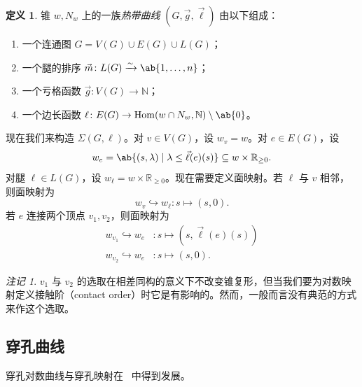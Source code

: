 \documentclass{amsart}
\theoremstyle{definition}
\newtheorem{defn}[thm]{定义}
\theoremstyle{remark}
\newtheorem{rmk}[thm]{注记}
\theoremstyle{plain}
\theoremstyle{definition}
\theoremstyle{remark}
\newcommand{\N}{\mathbb{N}}
\newcommand{\R}{\mathbb{R}}
\newcommand{\1}{\mathbf{1}}
\newcommand{\2}{\mathbf{2}}
\newcommand{\3}{\mathbf{3}}
\DeclareMathOperator{\Hom}{Hom}
\begin{document}
\begin{defn}
    锥 \(w, N_w\) 上的一族\textit{热带曲线} \((G, \vec{g}, \vec{\ell})\) 由以下组成：
    \begin{enumerate}
        \item 一个连通图 \(G = V(G) \cup E(G) \cup L(G)\)；
        \item 一个腿的排序 \(\vec{m} \colon L(G) \xrightarrow{\sim} \ab\{1, \ldots, n\}\)；
        \item 一个亏格函数 \(\vec{g} \colon V(G) \to \N\)；
        \item 一个边长函数 \(\ell \colon E(G) \to \Hom(w \cap N_w, \N) \setminus \ab\{0\}\)。
    \end{enumerate}
\end{defn}

现在我们来构造 \(\Sigma(G, \ell)\)。对 \(v \in V(G)\)，设 \(w_v = w\)。对 \(e \in E(G)\)，设
\[ w_e = \ab\{ (s, \lambda) \mid \lambda \leq \vec{\ell}(e)(s) \} \subseteq w \times \R_{\geq 0}. \]
对腿 \(\ell \in L(G)\)，设 \(w_{\ell} = w \times \R_{\geq 0}\)。现在需要定义面映射。若 \(\ell\) 与 \(v\) 相邻，则面映射为
\[ w_v \hookrightarrow w_{\ell} \colon s \mapsto (s, 0). \]
若 \(e\) 连接两个顶点 \(v_1, v_2\)，则面映射为
\begin{align*}
    w_{v_1} \hookrightarrow w_e &\colon s \mapsto (s, \vec{\ell}(e)(s)) \\
    w_{v_2} \hookrightarrow w_e & \colon s \mapsto (s, 0).
\end{align*}
\begin{rmk}
    \(v_1\) 与 \(v_2\) 的选取在相差同构的意义下不改变锥复形，但当我们要为对数映射定义接触阶（contact order）时它是有影响的。然而，一般而言没有典范的方式来作这个选取。
\end{rmk}

\subsection{穿孔曲线}%
\label{sub:Punctured curves}

穿孔对数曲线与穿孔映射在~\cite{ACGS2025} 中得到发展。
\end{document}
